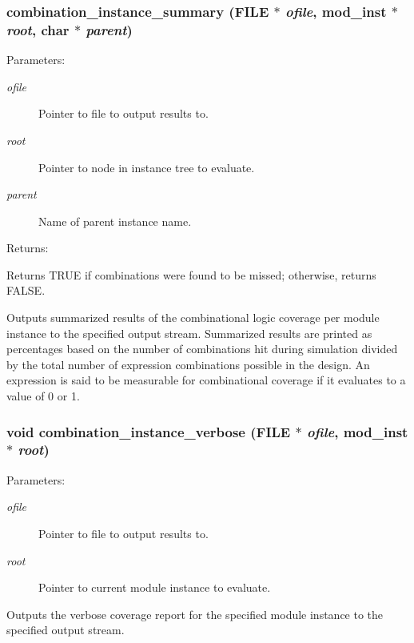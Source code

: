 \subsubsection{ combination\_\-instance\_\-summary (FILE $\ast$ {\em ofile}, {\bf mod\_\-inst} $\ast$ {\em root}, char $\ast$ {\em parent})}\label{comb_8c_a3}


\begin{Desc}
\item[Parameters: ]\par
\begin{description}
\item[{\em 
ofile}]Pointer to file to output results to. \item[{\em 
root}]Pointer to node in instance tree to evaluate. \item[{\em 
parent}]Name of parent instance name.\end{description}
\end{Desc}
\begin{Desc}
\item[Returns: ]\par
Returns TRUE if combinations were found to be missed; otherwise, returns FALSE.\end{Desc}
Outputs summarized results of the combinational logic coverage per module instance to the specified output stream. Summarized results are printed  as percentages based on the number of combinations hit during simulation  divided by the total number of expression combinations possible in the  design. An expression is said to be measurable for combinational coverage  if it evaluates to a value of 0 or 1. 
\subsubsection{\setlength{\rightskip}{0pt plus 5cm}void combination\_\-instance\_\-verbose (FILE $\ast$ {\em ofile}, {\bf mod\_\-inst} $\ast$ {\em root})}\label{comb_8c_a13}


\begin{Desc}
\item[Parameters: ]\par
\begin{description}
\item[{\em 
ofile}]Pointer to file to output results to. \item[{\em 
root}]Pointer to current module instance to evaluate.\end{description}
\end{Desc}
Outputs the verbose coverage report for the specified module instance to the specified output stream. 
